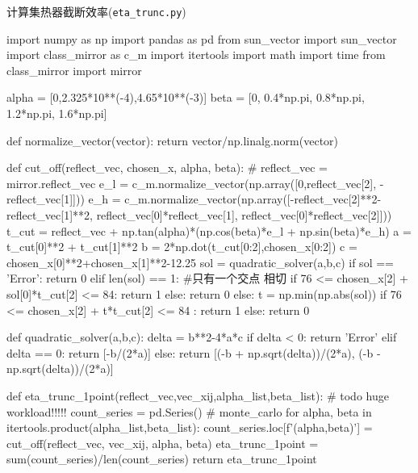 \documentclass{article}
\numberwithin{equation}{subsection}
\begin{document}
计算集热器截断效率(\verb|eta_trunc.py|)
\begin{python}
import numpy as np
import pandas as pd
from sun_vector import sun_vector
import class_mirror as c_m
import itertools
import math
import time
from class_mirror import mirror

alpha = [0,2.325*10**(-4),4.65*10**(-3)]
beta = [0, 0.4*np.pi, 0.8*np.pi, 1.2*np.pi, 1.6*np.pi]

def normalize_vector(vector):
    return vector/np.linalg.norm(vector)

def cut_off(reflect_vec, chosen_x, alpha, beta):
    # reflect_vec = mirror.reflect_vec
    e_l = c_m.normalize_vector(np.array([0,reflect_vec[2], -reflect_vec[1]]))
    e_h = c_m.normalize_vector(np.array([-reflect_vec[2]**2-reflect_vec[1]**2, reflect_vec[0]*reflect_vec[1], reflect_vec[0]*reflect_vec[2]]))
    t_cut = reflect_vec + np.tan(alpha)*(np.cos(beta)*e_l + np.sin(beta)*e_h)
    a = t_cut[0]**2 + t_cut[1]**2
    b = 2*np.dot(t_cut[0:2],chosen_x[0:2])
    c = chosen_x[0]**2+chosen_x[1]**2-12.25
    sol = quadratic_solver(a,b,c)
    if sol == 'Error':
        return 0
    elif len(sol) == 1: #只有一个交点 相切
        if 76 <= chosen_x[2] + sol[0]*t_cut[2] <= 84:
            return 1
        else:
            return 0
    else:
        t = np.min(np.abs(sol))
        if 76 <= chosen_x[2] + t*t_cut[2] <= 84 :
            return 1
        else:
            return 0



def quadratic_solver(a,b,c):
    delta = b**2-4*a*c
    if delta < 0:
        return 'Error'
    elif delta == 0:
        return [-b/(2*a)]
    else:
        return [(-b + np.sqrt(delta))/(2*a), (-b - np.sqrt(delta))/(2*a)]

def eta_trunc_1point(reflect_vec,vec_xij,alpha_list,beta_list): # todo huge workload!!!!!
    count_series = pd.Series() # monte_carlo
    for alpha, beta in itertools.product(alpha_list,beta_list):
        count_series.loc[f'({alpha},{beta})'] = cut_off(reflect_vec, vec_xij, alpha, beta)
    eta_trunc_1point = sum(count_series)/len(count_series)
    return eta_trunc_1point

\end{python}
\end{document}
